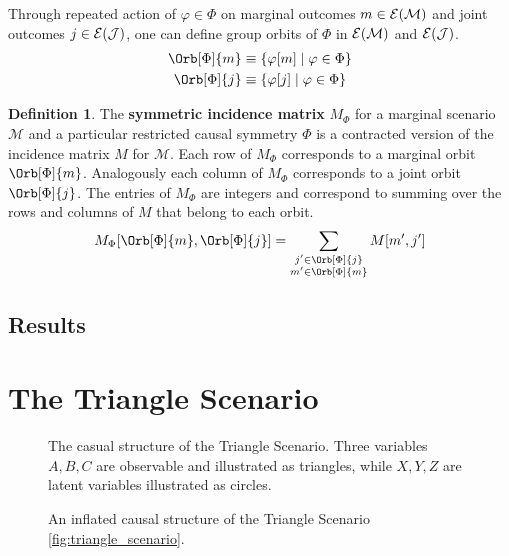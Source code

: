 \documentclass[aps, 10pt, english, twoside, pra, nofootinbib, longbibliography]{revtex4-1}
\theoremstyle{plain}
\theoremstyle{definition}
\newtheorem{definition}[theorem]{Definition}
\theoremstyle{remark}
\newcommand{\gep}{\varphi}
\newcommand{\gp}{\Phi}
\newcommand{\mscenario}{\mathcal{M}}
\newcommand{\jointvar}{\mathcal{J}}
\newcommand{\term}[1]{\textcolor{Mahogany}{\textbf{#1}}}
\newcommand{\Events}[1]{\s{E}\br{#1}} %
\begin{document}
    Through repeated action of $\gep \in \gp$ on marginal outcomes $m \in \Events{\mscenario}$ and joint outcomes $j \in \Events{\jointvar}$, one can define group orbits of $\gp$ in $\Events{\mscenario}$ and $\Events{\jointvar}$.
    \begin{align*}
        \Orb[\gp]{m} &\defined \bc{\gep\bs{m} \mid \gep \in \gp} \\
        \Orb[\gp]{j} &\defined \bc{\gep\bs{j} \mid \gep \in \gp}
    \end{align*}

    \begin{definition}
        The \term{symmetric incidence matrix} $M_{\gp}$ for a marginal scenario $\mscenario$ and a particular restricted causal symmetry $\gp$ is a contracted version of the incidence matrix $M$ for $\mscenario$. Each row of $M_{\gp}$ corresponds to a marginal orbit $\Orb[\gp]{m}$. Analogously each column of $M_{\gp}$ corresponds to a joint orbit $\Orb[\gp]{j}$. The entries of $M_{\gp}$ are integers and correspond to summing over the rows and columns of $M$ that belong to each orbit.
        \[ M_{\gp}\bs{\Orb[\gp]{m}, \Orb[\gp]{j}} = \sum_{\substack{j' \in \Orb[\gp]{j} \\ m' \in \Orb[\gp]{m}}} M\bs{m',j'} \]
    \end{definition}

    \subsection{Results}


    \section{The Triangle Scenario}
    \label{sec:triangle_scenario}
    \begin{figure}
    \begin{center}
        \begin{minipage}[b]{.48\textwidth}
            \centering
            \scalebox{1.0}{}
            \caption{The casual structure of the Triangle Scenario. Three variables $A,B,C$ are observable and illustrated as triangles, while $X, Y, Z$ are latent variables illustrated as circles.}
            \label{fig:triangle_scenario}
        \end{minipage}\hspace{0.04\textwidth}%
        \begin{minipage}[b]{.48\textwidth}
            \centering
            \scalebox{0.8}{}
            \caption{An inflated causal structure of the Triangle Scenario \cref{fig:triangle_scenario}.}
            \label{fig:inflated_triangle_scenario}
        \end{minipage}
    \end{center}
    \end{figure}
\end{document}

